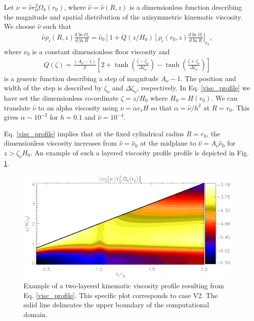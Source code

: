 Let $\nu = \hat{\nu}r_0^2\Omega_k(r_0)$, where
$\hat{\nu}=\hat{\nu}(R,z)$ is a dimensionless function describing
the magnitude and spatial distribution of the axisymmetric kinematic
viscosity. We choose $\hat{\nu}$ such that   
\begin{align}\label{visc_profile}
  \hat{\nu}\rho_i(R,z)\frac{d\ln{\Omega_i}}{d\ln{R}} =
  \hat{\nu}_0\left[1+Q(z/H_0)\right]\rho_i(r_0,z)\left.\frac{d\ln{\Omega_i}}{d\ln{R}}\right|_{r_0}, 
\end{align}
where $\nu_0$ is a constant dimensionless floor viscosity and   
\begin{align}\label{step}
  Q(\zeta) = \frac{\left(A_\nu - 1\right)}{2}
  \left[  2 + \tanh{\left(\frac{\zeta - \zeta_\nu}{\Delta\zeta_\nu}\right)}
    - \tanh{\left(\frac{\zeta +
        \zeta_\nu}{\Delta\zeta_\nu}\right)}\right]
\end{align}
is a generic function describing a step of magnitude
$A_\nu-1$. The position and width of the step is described by
$\zeta_\nu$ and $\Delta\zeta_\nu$, respectively. 
In Eq. \ref{visc_profile} we have set the dimensionless co-ordinate
$\zeta=z/H_0$ where $H_0=H(r_0)$. %
We can translate $\hat{\nu}$ to an alpha viscosity 
using $\nu = \alpha c_s H$ \citep{shakura73} so that $\alpha =
\hat{\nu}/h^2$ at $R=r_0$.  This gives $\alpha\sim 10^{-2}$ for
$h=0.1$ and $\hat{\nu}=10^{-4}$. 

Eq. \ref{visc_profile} implies that at the fixed cylindrical radius
$R=r_0$, the dimensionless viscosity increases from $\hat{\nu} =
\hat{\nu}_0$ at the midplane to $\hat{\nu} = A_\nu\hat{\nu}_0$ for
$z > \zeta_\nu H_0$. An example of such a layered viscosity profile
profile is depicted in Fig. \ref{visc2d}. 
 

\begin{figure}
  \centering
  \includegraphics[width=\linewidth]{figures/pdisk_visc2d_layer2}
  \caption{Example of a two-layered kinematic viscosity profile
    resulting from Eq. \ref{visc_profile}. This specific plot
    corresponds to case V2. The solid line
    delineates the upper boundary of the computational domain.
    \label{visc2d}}
\end{figure}


